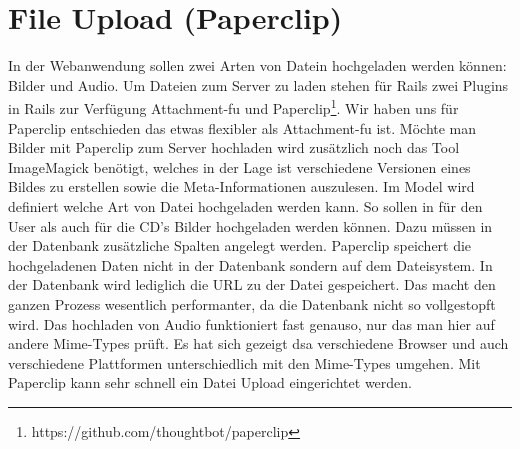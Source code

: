 \section{File Upload (Paperclip)}
\label{sec:File Upload (Paperclip)}
In der Webanwendung sollen zwei Arten von Datein hochgeladen werden können: Bilder und Audio. Um Dateien zum Server zu laden stehen für Rails zwei Plugins in Rails zur Verfügung Attachment-fu  und Paperclip\footnote{https://github.com/thoughtbot/paperclip}. Wir haben uns für Paperclip entschieden das etwas flexibler als Attachment-fu ist. Möchte man Bilder mit Paperclip zum Server hochladen wird zusätzlich noch das Tool ImageMagick benötigt, welches in der Lage ist verschiedene Versionen eines Bildes zu erstellen sowie die Meta-Informationen auszulesen. Im Model wird definiert welche Art von Datei hochgeladen werden kann. So sollen in für den User als auch für die CD's Bilder hochgeladen werden können. Dazu müssen in der Datenbank zusätzliche Spalten angelegt werden. Paperclip speichert die hochgeladenen Daten nicht in der Datenbank sondern auf dem Dateisystem. In der Datenbank wird lediglich die URL zu der Datei gespeichert. Das macht den ganzen Prozess wesentlich performanter, da die Datenbank nicht so vollgestopft wird. Das hochladen von Audio funktioniert fast genauso, nur das man hier auf andere Mime-Types prüft. Es hat sich gezeigt dsa verschiedene Browser und auch verschiedene Plattformen unterschiedlich mit den Mime-Types umgehen. Mit Paperclip kann sehr schnell ein Datei Upload eingerichtet werden.